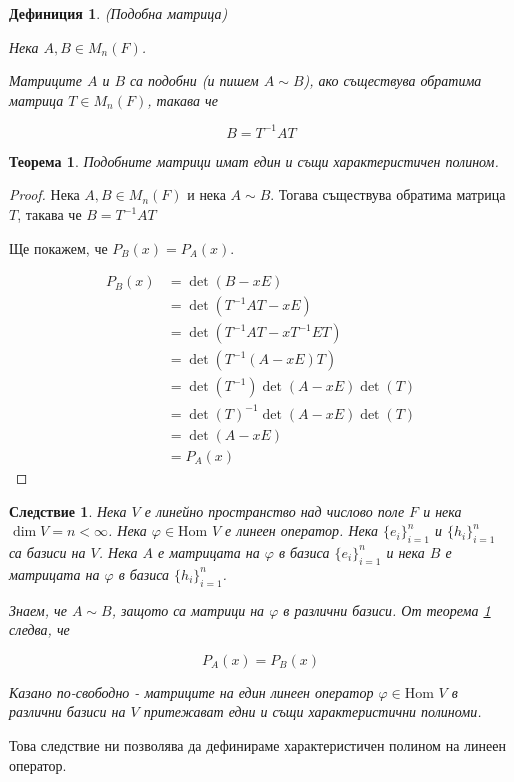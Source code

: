 \documentclass{scrartcl}
\newtheorem{theorem}{Теорема}
\newtheorem{definition}{Дефиниция}
\newtheorem{sledstvie}{Следствие}
\begin{document}
\begin{FlushLeft}
\begin{definition}
(Подобна матрица)

Нека $A, B \in M_n(F)$.

Матриците $A$ и $B$ са подобни (и пишем $A \sim B$), ако съществува обратима матрица $T \in M_n(F)$, такава че

$$B = T^{-1}AT$$
\end{definition}

\begin{theorem}\label{th:sim_matrix}
Подобните матрици имат един и същи характеристичен полином.
\end{theorem}

\begin{proof}
Нека $A, B \in M_n(F)$ и нека $A \sim B$. Тогава съществува обратима матрица $T$, такава че $B = T^{-1}AT$

Ще покажем, че $P_B(x) = P_A(x)$.

\begin{align*}
P_B(x)
&= \det(B - x E)\\
&= \det(T^{-1}AT - x E)\\
&= \det(T^{-1}AT - x T^{-1} ET)\\
&= \det(T^{-1}(A - x E)T)\\
&= \det(T^{-1})\det(A - x E)\det(T)\\
&= \det(T)^{-1}\det(A - x E)\det(T)\\
&= \det(A - x E)\\
&= P_A(x)
\end{align*}
\end{proof}

\begin{sledstvie}
Нека $V$ е линейно пространство над числово поле $F$ и нека $\dim V = n < \infty$.
Нека $\varphi \in \text{Hom }{V}$ е линеен оператор.
Нека $\{e_i\}_{i=1}^n$ и $\{h_i\}_{i=1}^n$ са базиси на $V$.
Нека $A$ е матрицата на $\varphi$ в базиса $\{e_i\}_{i=1}^n$ и нека $B$ е матрицата на $\varphi$ в базиса $\{h_i\}_{i=1}^n$.

Знаем, че $A \sim B$, защото са матрици на $\varphi$ в различни базиси. От теорема \ref{th:sim_matrix} следва, че

$$P_A(x) = P_B(x)$$

Казано по-свободно - матриците на един линеен оператор $\varphi \in \text{Hom }V$ в различни базиси на $V$ притежават едни и същи характеристични полиноми.
\end{sledstvie}

Това следствие ни позволява да дефинираме характеристичен полином на линеен оператор.


\end{FlushLeft}
\end{document}
